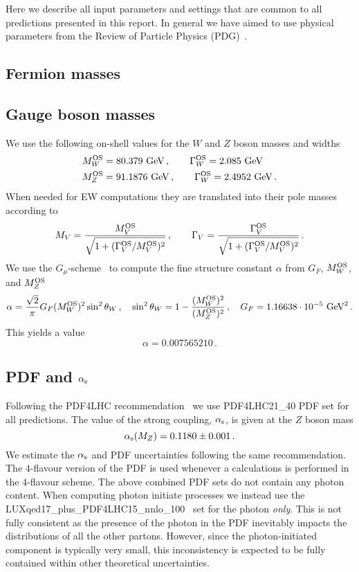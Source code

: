 Here we describe all input parameters and settings that are common to
all predictions presented in this report. In general we have aimed to use physical parameters from the Review of Particle Physics (PDG)~\cite{ParticleDataGroup:2020ssz}.
\subsection{Fermion masses}

\subsection{Gauge boson masses}
We use the following on-shell values for the $W$ and $Z$ boson masses
and widths
\begin{align}
        M^{\mathrm{OS}}_W &= 80.379~\mathrm{GeV}\,, \qquad \Gamma^{\mathrm{OS}}_W=2.085~\mathrm{GeV} \notag \\
        M^{\mathrm{OS}}_Z &= 91.1876~\mathrm{GeV}\,, \qquad \Gamma^{\mathrm{OS}}_W=2.4952~\mathrm{GeV}\,.
\end{align}
When needed for EW computations they are translated into their pole
masses~\cite{BARDIN1988539} according to
\begin{align}
        M_V = \frac{M^{\mathrm{OS}}_V}{\sqrt{1+(\Gamma^{\mathrm{OS}}_V/M^{\mathrm{OS}}_V)^2}}\,, \qquad \Gamma_V = \frac{\Gamma^{\mathrm{OS}}_V}{\sqrt{1+(\Gamma^{\mathrm{OS}}_V/M^{\mathrm{OS}}_V)^2}}\,.
\end{align}     
We use the $G_\mu$-scheme~\cite{Denner:2000bj} to compute the fine
structure constant $\alpha$ from $G_F$, $M^{\mathrm{OS}}_W$, and $M^{\mathrm{OS}}_Z$
\begin{align}
        \alpha = \frac{\sqrt{2}}{\pi}G_F(M^{\mathrm{OS}}_W)^2\sin^2\theta_W\,, \quad \sin^2\theta_W = 1-\frac{(M^{\mathrm{OS}}_W)^2}{(M^{\mathrm{OS}}_Z)^2}\,,\quad G_F=1.16638\cdot 10^{-5} ~\mathrm{GeV}^2\,.
\end{align}
This yields a value
\begin{equation}
        \alpha = 0.007565210\,.
\end{equation}


\subsection{PDF and $\alpha_{\mathrm{s}}$}
Following the PDF4LHC
recommendation~\cite{PDF4LHCWorkingGroup:2022cjn} we use PDF4LHC21\_40
PDF set for all predictions. The value of the strong coupling,
$\alpha_{\mathrm{s}}$, is given at the $Z$ boson mass
\begin{equation}
        \alpha_{\mathrm{s}}(M_Z) = 0.1180\pm0.001\,.
\end{equation}  
We estimate the $\alpha_{\mathrm{s}}$ and PDF uncertainties following the same
recommendation. The $4$-flavour version of the PDF is used whenever a
calculations is performed in the $4$-flavour scheme. The above
combined PDF sets do not contain any photon content. When computing
photon initiate processes we instead use the
LUXqed17\_plus\_PDF4LHC15\_nnlo\_100~\cite{Manohar:2017eqh} set for
the photon \emph{only}. This is not fully consistent as the presence
of the photon in the PDF inevitably impacts the distributions of all
the other partons. However, since the photon-initiated component is
typically very small, this inconsistency is expected to be fully
contained within other theoretical uncertainties.
